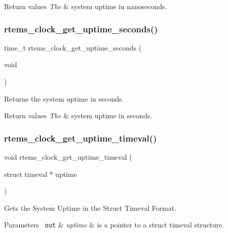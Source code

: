 \begin{DoxyRetVals}{Return values}
{\em The} & system uptime in nanoseconds. \\
\hline
\end{DoxyRetVals}
\mbox{\label{group__ClassicClock_ga31eb8dcc4fffd67697ece9db621965e6}} 
\subsubsection{\texorpdfstring{rtems\_clock\_get\_uptime\_seconds()}{rtems\_clock\_get\_uptime\_seconds()}}
{\footnotesize\ttfamily time\+\_\+t rtems\+\_\+clock\+\_\+get\+\_\+uptime\+\_\+seconds (\begin{DoxyParamCaption}\item[{void}]{ }\end{DoxyParamCaption})}



Returns the system uptime in seconds. 


\begin{DoxyRetVals}{Return values}
{\em The} & system uptime in seconds. \\
\hline
\end{DoxyRetVals}
\mbox{\label{group__ClassicClock_ga393bdba39f4e590ee5db5e837204e6ec}} 
\subsubsection{\texorpdfstring{rtems\_clock\_get\_uptime\_timeval()}{rtems\_clock\_get\_uptime\_timeval()}}
{\footnotesize\ttfamily void rtems\+\_\+clock\+\_\+get\+\_\+uptime\+\_\+timeval (\begin{DoxyParamCaption}\item[{struct timeval $\ast$}]{uptime }\end{DoxyParamCaption})}



Gets the System Uptime in the Struct Timeval Format. 


\begin{DoxyParams}[1]{Parameters}
\mbox{\texttt{ out}}  & {\em uptime} & is a pointer to a struct timeval structure.\\
\hline
\end{DoxyParams}

